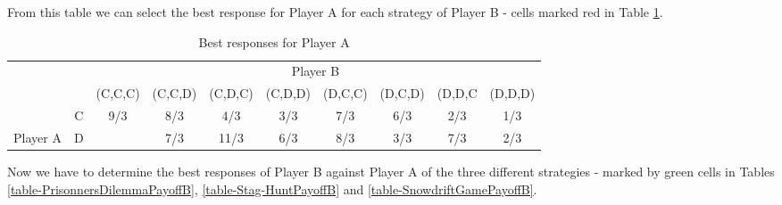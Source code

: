 \documentclass[a4paper, 11pt]{article}
\begin{document}
From this table we can select the best response for Player A for each strategy of Player B - cells marked red in Table \ref{table-expectedPayoffForA-SelectedCells}.

\begin{table}[!htb]
\centering
\caption{Best responses for Player A}
\label{table-expectedPayoffForA-SelectedCells}
\begin{tabular}{lc|c|c|c|c|c|c|c|c|}
\cline{3-10}
                                                 & \multicolumn{1}{c|}{} & \multicolumn{8}{c|}{Player B}                                                                                                                                                                                                                                          \\ \cline{3-10} 
                                                 &                       & (C,C,C)                                             & (C,C,D)                     & (C,D,C)                      & (C,D,D)                     & (D,C,C)                     & (D,C,D)                     & (D,D,C                      & (D,D,D)                     \\ \hline
\multicolumn{1}{|l|}{}                           & C                     & 9/3                                                 & \cellcolor[HTML]{FE0000}8/3 & 4/3                          & 3/3                         & 7/3                         & \cellcolor[HTML]{FE0000}6/3 & 2/3                         & 1/3                         \\ \cline{2-10} 
\multicolumn{1}{|l|}{\multirow{-2}{*}{Player A}} & D                     & \cellcolor[HTML]{FE0000}{\color[HTML]{000000} 12/3} & 7/3                         & \cellcolor[HTML]{FE0000}11/3 & \cellcolor[HTML]{FE0000}6/3 & \cellcolor[HTML]{FE0000}8/3 & 3/3                         & \cellcolor[HTML]{FE0000}7/3 & \cellcolor[HTML]{FE0000}2/3 \\ \hline
\end{tabular}
\end{table}


Now we have to determine the best responses of Player B against Player A of the three different strategies - marked by green cells in Tables \ref{table-PrisonnersDilemmaPayoffB}, \ref{table-Stag-HuntPayoffB} and \ref{table-SnowdriftGamePayoffB}.
\end{document}
